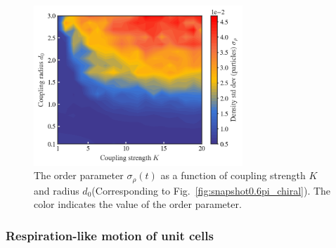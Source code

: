 \documentclass{article}
\begin{document}
\begin{figure}[H]
    \centering
    \includegraphics[width=0.7\textwidth]{./figs/orderParameter_varying_strengthK_and_distanceD0.png}
    \caption{
        \label{fig:orderParameter_varying_strengthK_and_distanceD0}
        The order parameter $\sigma _{\rho}\left( t \right)$ as a function of coupling strength $K$ and radius $d_0$(Corresponding to Fig.~\ref{fig:snapshot0.6pi_chiral}). The color indicates the value of the order parameter.
    }
\end{figure}

\newpage
\subsubsection{Respiration-like motion of unit cells}
\end{document}

